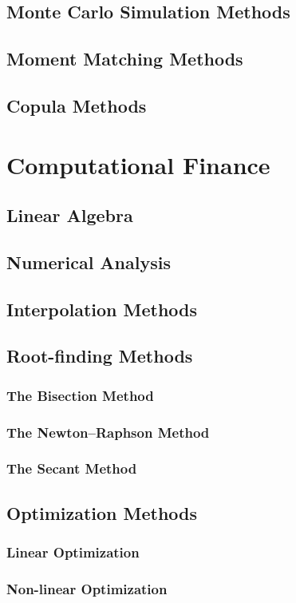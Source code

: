 \documentclass{book}
\begin{document}
\section{Monte Carlo Simulation Methods}
\section{Moment Matching Methods}
\section{Copula Methods}

\chapter{Computational Finance}
\section{Linear Algebra}
\section{Numerical Analysis}
\section{Interpolation Methods}
\section{Root-finding Methods}
\subsection{The Bisection Method}
\subsection{The Newton--Raphson Method}
\subsection{The Secant Method}
\section{Optimization Methods}
\subsection{Linear Optimization}
\subsection{Non-linear Optimization}
\end{document}
